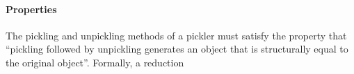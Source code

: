 \documentclass[preprint,10pt]{sigplanconf}
\theoremstyle{definition}
\theoremstyle{definition}
\newcommand{\ba}{\begin{array}}
\newcommand{\ea}{\end{array}}
\newcommand{\sub}{<:}
\newcommand{\sreducestar}[6]{#1, #2, #3 \;\longrightarrow^{\ast}\; #4, #5, #6}
\begin{document}
\paragraph{Properties} The pickling and unpickling methods of a pickler must
satisfy the property that ``pickling followed by unpickling generates an
object that is structurally equal to the original object''. Formally, a reduction













\end{document}
